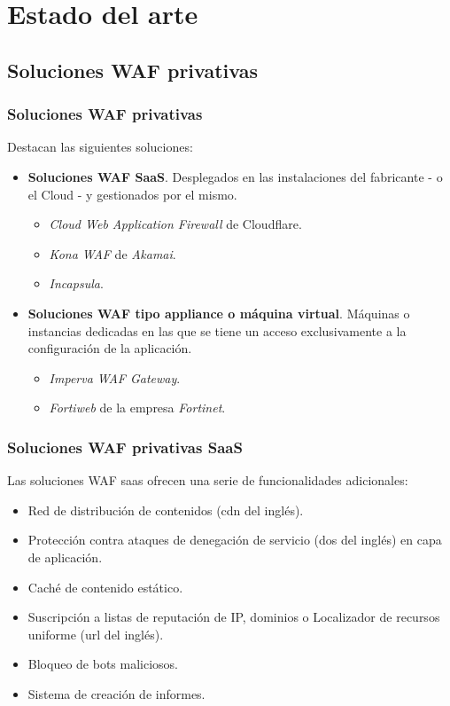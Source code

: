 \section{Estado del arte}


\subsection{Soluciones WAF privativas}
\begin{frame}[shrink]
  \frametitle{Soluciones WAF privativas}
  Destacan las siguientes soluciones:
  \begin{itemize}
    \item {\bf Soluciones WAF SaaS}. Desplegados en las instalaciones del fabricante - o el Cloud - y gestionados por el mismo.
      \begin{itemize}
        \item {\em Cloud Web Application Firewall} \cite{cloudflarewaf} de Cloudflare\cite{cloudflare}.
        \item {\em Kona WAF\cite{kona}} de {\em Akamai\cite{akamai}}.
        \item {\em Incapsula\cite{Incapsula}}.
      \end{itemize}
    \item {\bf Soluciones WAF tipo appliance o máquina virtual}. Máquinas o instancias dedicadas en las que se tiene un acceso exclusivamente a la configuración de la aplicación.
      \begin{itemize}
        \item {\em Imperva WAF Gateway\cite{imperva}}.
        \item {\em Fortiweb\cite{fortiweb}} de la empresa {\em Fortinet\cite{fortinet}}.
      \end{itemize}
  \end{itemize}
\end{frame}

\begin{frame}[shrink]
  \frametitle{Soluciones WAF privativas SaaS}
  Las soluciones WAF \acrshort{saas} ofrecen una serie de funcionalidades adicionales:
  \begin{itemize}
    \item Red de distribución de contenidos (\acrlong{cdn} del inglés).
    \item Protección contra ataques de denegación de servicio (\acrshort{dos} del inglés) en capa de aplicación.
    \item Caché de contenido estático.
    \item Suscripción a listas de reputación de IP, dominios o Localizador de recursos uniforme (\acrshort{url} del inglés).
    \item Bloqueo de bots maliciosos.
    \item Sistema de creación de informes.
  \end{itemize}
\end{frame}

